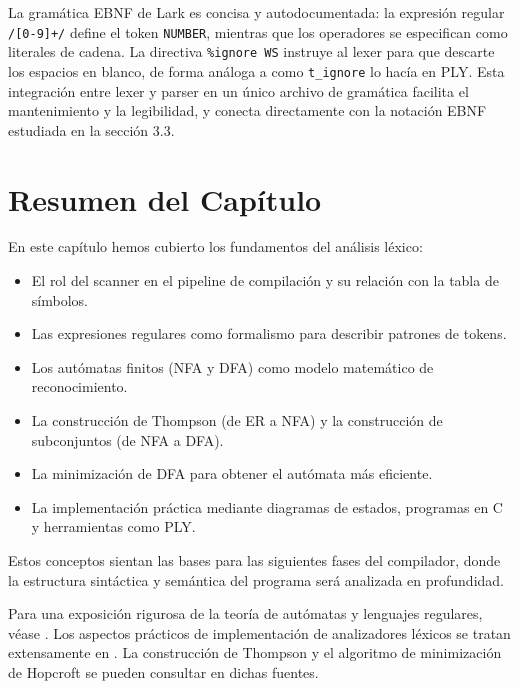 La gramática EBNF de Lark es concisa y autodocumentada: la expresión regular \texttt{/[0-9]+/} define el token \texttt{NUMBER}, mientras que los operadores se especifican como literales de cadena. La directiva \texttt{\%ignore WS} instruye al lexer para que descarte los espacios en blanco, de forma análoga a como \texttt{t\_ignore} lo hacía en PLY. Esta integración entre lexer y parser en un único archivo de gramática facilita el mantenimiento y la legibilidad, y conecta directamente con la notación EBNF estudiada en la sección 3.3.

\section{Resumen del Capítulo}

En este capítulo hemos cubierto los fundamentos del análisis léxico:
\begin{itemize}
    \item El rol del scanner en el pipeline de compilación y su relación con la tabla de símbolos.
    \item Las expresiones regulares como formalismo para describir patrones de tokens.
    \item Los autómatas finitos (NFA y DFA) como modelo matemático de reconocimiento.
    \item La construcción de Thompson (de ER a NFA) y la construcción de subconjuntos (de NFA a DFA).
    \item La minimización de DFA para obtener el autómata más eficiente.
    \item La implementación práctica mediante diagramas de estados, programas en C y herramientas como PLY.
\end{itemize}

Estos conceptos sientan las bases para las siguientes fases del compilador, donde la estructura sintáctica y semántica del programa será analizada en profundidad.

\begin{notasbib}
Para una exposición rigurosa de la teoría de autómatas y lenguajes regulares, véase \cite{sipser2012introduction}. Los aspectos prácticos de implementación de analizadores léxicos se tratan extensamente en \cite{aho2006compilers}. La construcción de Thompson y el algoritmo de minimización de Hopcroft se pueden consultar en dichas fuentes.
\end{notasbib}

\printbibliography[heading=subbibliography]